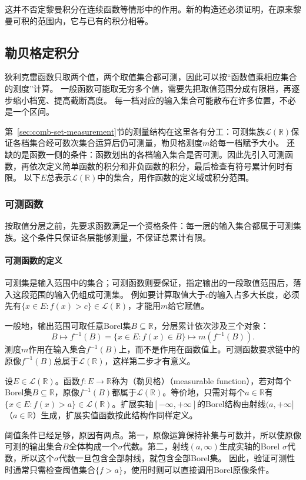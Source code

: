 这并不否定黎曼积分在连续函数等情形中的作用。新的构造还必须证明，在原来黎曼可积的范围内，它与已有的积分相等。

\subsection{勒贝格定积分}
\label{sec:analysis-lebesgue-definite-integral}

狄利克雷函数只取两个值，两个取值集合都可测，因此可以按“函数值乘相应集合的测度”计算。
一般函数可能取无穷多个值，需要先把取值范围分成有限档，再逐步缩小档宽、提高截断高度。
每一档对应的输入集合可能散布在许多位置，不必是一个区间。

第~\ref{sec:comb-set-measurement}节的测量结构在这里各有分工：可测集族$\mathcal L(\mathbb R)$保证各档集合经可数次集合运算后仍可测量，勒贝格测度$m$给每一档赋予大小。
还缺的是函数一侧的条件：函数划出的各档输入集合是否可测。因此先引入可测函数，再依次定义简单函数的积分和非负函数的积分，最后检查有符号累计何时有限。
以下$E$总表示$\mathcal L(\mathbb R)$中的集合，用作函数的定义域或积分范围。

\subsubsection{可测函数}
\label{sec:analysis-measurable-functions}

按取值分层之前，先要求函数满足一个资格条件：每一层的输入集合都属于可测集族。这个条件只保证各层能够测量，不保证总累计有限。


\paragraph{可测函数的定义}
可测集是输入范围中的集合；可测函数则要保证，指定输出的一段取值范围后，落入这段范围的输入仍组成可测集。
例如要计算取值大于$c$的输入占多大长度，必须先有$\{x\in E:f(x)>c\}\in\mathcal L(\mathbb R)$，才能用$m$给它赋值。

一般地，输出范围可取任意Borel集$B\subseteq\mathbb R$，分层累计依次涉及三个对象：
\[
 B\longmapsto f^{-1}(B)=\{x\in E:f(x)\in B\}
 \longmapsto m(f^{-1}(B)).
\]
测度$m$作用在输入集合$f^{-1}(B)$上，而不是作用在函数值上。可测函数要求链中的原像$f^{-1}(B)$总属于$\mathcal L(\mathbb R)$，这样第二步才有意义。
\begin{definition}[可测函数]
\label{def:analysis-measurable-function}
设$E\in\mathcal L(\mathbb R)$。函数$f:E\to\mathbb R$称为（勒贝格）（measurable function），若对每个Borel集$B\subseteq\mathbb R$，原像$f^{-1}(B)$都属于$\mathcal L(\mathbb R)$。等价地，只需对每个$a\in\mathbb R$有$\{x\in E:f(x)>a\}\in\mathcal L(\mathbb R)$。扩展实轴$[-\infty,+\infty]$的Borel结构由射线$(a,+\infty]$（$a\in\mathbb R$）生成，扩展实值函数按此结构作同样定义。
\end{definition}
阈值条件已经足够，原因有两点。第一，原像运算保持补集与可数并，所以使原像可测的输出集合$B$全体构成一个$\sigma$代数。第二，射线$(a,\infty)$生成实轴的Borel $\sigma$代数，所以这个$\sigma$代数一旦包含全部射线，就包含全部Borel集。
因此，验证可测性时通常只需检查阈值集合$\{f>a\}$，使用时则可以直接调用Borel原像条件。

